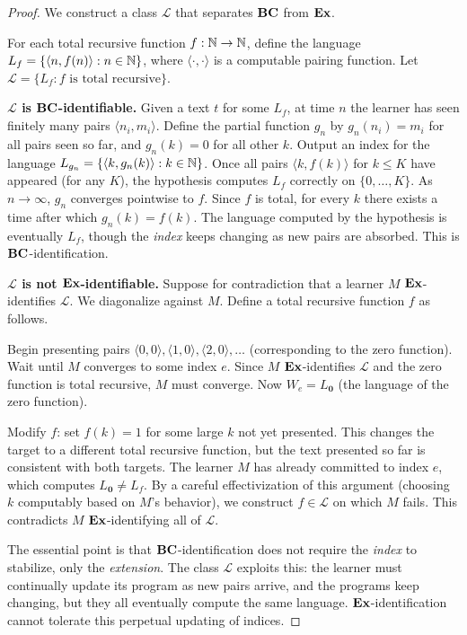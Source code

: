 \begin{proof}
We construct a class $\mathcal{L}$ that separates $\mathbf{BC}$ from $\mathbf{Ex}$.

For each total recursive function $f : \mathbb{N} \to \mathbb{N}$, define the language $L_f = \{\langle n, f(n)\rangle : n \in \mathbb{N}\}$, where $\langle \cdot, \cdot \rangle$ is a computable pairing function. Let $\mathcal{L} = \{L_f : f \text{ is total recursive}\}$.

\medskip\noindent\textbf{$\mathcal{L}$ is $\mathbf{BC}$-identifiable.} Given a text $t$ for some $L_f$, at time $n$ the learner has seen finitely many pairs $\langle n_i, m_i\rangle$. Define the partial function $g_n$ by $g_n(n_i) = m_i$ for all pairs seen so far, and $g_n(k) = 0$ for all other $k$. Output an index for the language $L_{g_n} = \{\langle k, g_n(k)\rangle : k \in \mathbb{N}\}$. Once all pairs $\langle k, f(k)\rangle$ for $k \leq K$ have appeared (for any $K$), the hypothesis computes $L_f$ correctly on $\{0, \ldots, K\}$. As $n \to \infty$, $g_n$ converges pointwise to $f$. Since $f$ is total, for every $k$ there exists a time after which $g_n(k) = f(k)$. The language computed by the hypothesis is eventually $L_f$, though the \emph{index} keeps changing as new pairs are absorbed. This is $\mathbf{BC}$-identification.

\medskip\noindent\textbf{$\mathcal{L}$ is not $\mathbf{Ex}$-identifiable.} Suppose for contradiction that a learner $M$ $\mathbf{Ex}$-identifies $\mathcal{L}$. We diagonalize against $M$. Define a total recursive function $f$ as follows.

Begin presenting pairs $\langle 0, 0\rangle, \langle 1, 0\rangle, \langle 2, 0\rangle, \ldots$ (corresponding to the zero function). Wait until $M$ converges to some index $e$. Since $M$ $\mathbf{Ex}$-identifies $\mathcal{L}$ and the zero function is total recursive, $M$ must converge. Now $W_e = L_{\mathbf{0}}$ (the language of the zero function).

Modify $f$: set $f(k) = 1$ for some large $k$ not yet presented. This changes the target to a different total recursive function, but the text presented so far is consistent with both targets. The learner $M$ has already committed to index $e$, which computes $L_{\mathbf{0}} \neq L_f$. By a careful effectivization of this argument (choosing $k$ computably based on $M$'s behavior), we construct $f \in \mathcal{L}$ on which $M$ fails. This contradicts $M$ $\mathbf{Ex}$-identifying all of $\mathcal{L}$.

The essential point is that $\mathbf{BC}$-identification does not require the \emph{index} to stabilize, only the \emph{extension}. The class $\mathcal{L}$ exploits this: the learner must continually update its program as new pairs arrive, and the programs keep changing, but they all eventually compute the same language. $\mathbf{Ex}$-identification cannot tolerate this perpetual updating of indices.
\end{proof}

